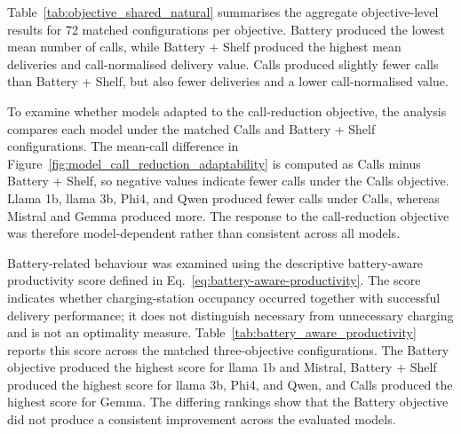 Table~\ref{tab:objective_shared_natural} summarises the aggregate objective-level results for 72 matched configurations per objective. Battery produced the lowest mean number of calls, while Battery + Shelf produced the highest mean deliveries and call-normalised delivery value. Calls produced slightly fewer calls than Battery + Shelf, but also fewer deliveries and a lower call-normalised value.

\begin{table}[H]
\centering
\small
{}
\caption{Objective-level calls and deliveries across configurations matched among the Calls, Battery + Shelf, and Battery objectives.}
\label{tab:objective_shared_natural}
\end{table}

To examine whether models adapted to the call-reduction objective, the analysis compares each model under the matched Calls and Battery + Shelf configurations. The mean-call difference in Figure~\ref{fig:model_call_reduction_adaptability} is computed as Calls minus Battery + Shelf, so negative values indicate fewer calls under the Calls objective. Llama 1b, llama 3b, Phi4, and Qwen produced fewer calls under Calls, whereas Mistral and Gemma produced more. The response to the call-reduction objective was therefore model-dependent rather than consistent across all models.

Battery-related behaviour was examined using the descriptive battery-aware productivity score defined in Eq.~\ref{eq:battery-aware-productivity}. The score indicates whether charging-station occupancy occurred together with successful delivery performance; it does not distinguish necessary from unnecessary charging and is not an optimality measure. Table~\ref{tab:battery_aware_productivity} reports this score across the matched three-objective configurations. The Battery objective produced the highest score for llama 1b and Mistral, Battery + Shelf produced the highest score for llama 3b, Phi4, and Qwen, and Calls produced the highest score for Gemma. The differing rankings show that the Battery objective did not produce a consistent improvement across the evaluated models.

